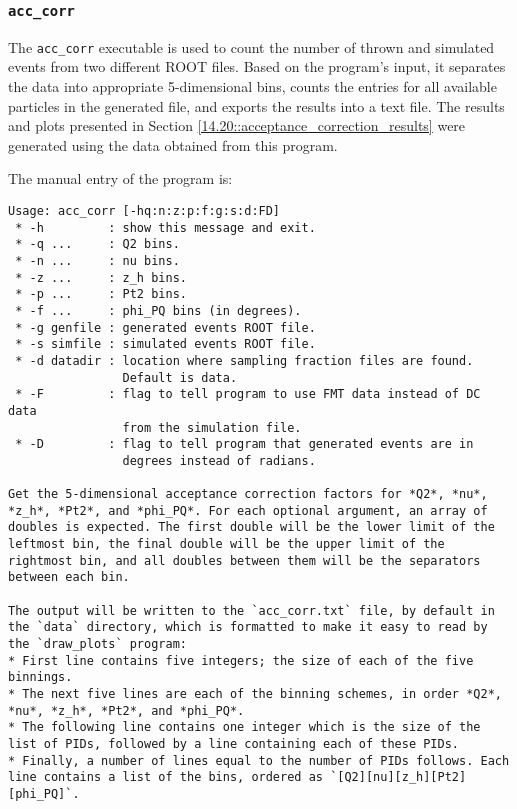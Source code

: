\subsubsection{\texttt{acc\_corr}}
\label{13.13::acc_corr}
    The \texttt{acc\_corr} executable is used to count the number of thrown and simulated events from two different ROOT files.
    Based on the program's input, it separates the data into appropriate 5-dimensional bins, counts the entries for all available particles in the generated file, and exports the results into a text file.
    The results and plots presented in Section \ref{14.20::acceptance_correction_results} were generated using the data obtained from this program.

    The manual entry of the program is:
    \begin{lstlisting}
Usage: acc_corr [-hq:n:z:p:f:g:s:d:FD]
 * -h         : show this message and exit.
 * -q ...     : Q2 bins.
 * -n ...     : nu bins.
 * -z ...     : z_h bins.
 * -p ...     : Pt2 bins.
 * -f ...     : phi_PQ bins (in degrees).
 * -g genfile : generated events ROOT file.
 * -s simfile : simulated events ROOT file.
 * -d datadir : location where sampling fraction files are found.
                Default is data.
 * -F         : flag to tell program to use FMT data instead of DC data
                from the simulation file.
 * -D         : flag to tell program that generated events are in
                degrees instead of radians.

Get the 5-dimensional acceptance correction factors for *Q2*, *nu*, *z_h*, *Pt2*, and *phi_PQ*. For each optional argument, an array of doubles is expected. The first double will be the lower limit of the leftmost bin, the final double will be the upper limit of the rightmost bin, and all doubles between them will be the separators between each bin.

The output will be written to the `acc_corr.txt` file, by default in the `data` directory, which is formatted to make it easy to read by the `draw_plots` program:
* First line contains five integers; the size of each of the five binnings.
* The next five lines are each of the binning schemes, in order *Q2*, *nu*, *z_h*, *Pt2*, and *phi_PQ*.
* The following line contains one integer which is the size of the list of PIDs, followed by a line containing each of these PIDs.
* Finally, a number of lines equal to the number of PIDs follows. Each line contains a list of the bins, ordered as `[Q2][nu][z_h][Pt2][phi_PQ]`.
    \end{lstlisting}
